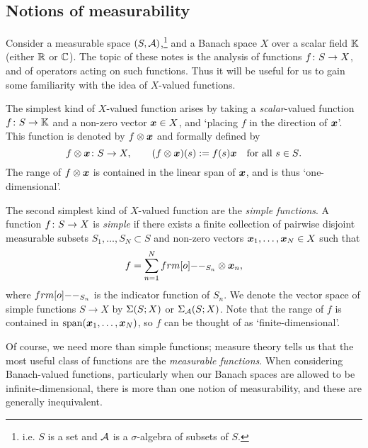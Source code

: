 
\subsection{Notions of measurability}

Consider a measurable space $(S,\mathcal{A})$,\footnote{i.e. $S$ is a set and $\mathcal{A}$ is a $\sigma$-algebra of subsets of $S$.} and a Banach space $X$ over a scalar field $\mathbb{K}$ (either $\mathbb{R}$ or $\mathbb{C}$).
The topic of these notes is the analysis of functions $f \colon S \rightarrow X$, and of operators acting on such functions.
Thus it will be useful for us to gain some familiarity with the idea of $X$-valued functions.

The simplest kind of $X$-valued function arises by taking a \emph{scalar}-valued function $f \colon S \rightarrow \mathbb{K}$ and a non-zero vector $\bm{x} \in X$, and `placing $f$ in the direction of $\bm{x}$'.
This function is denoted by $f \otimes \bm{x}$ and formally defined by
\begin{equation*}
  f \otimes \bm{x} \colon S \rightarrow X, \qquad (f \otimes \bm{x})(s) := f(s)\bm{x} \quad \text{for all $s \in S$.}
\end{equation*}
The range of $f \otimes \bm{x}$ is contained in the linear span of $\bm{x}$, and is thus `one-dimensional'.

The second simplest kind of $X$-valued function are the \emph{simple functions}.
A function $f \colon S \rightarrow X$ is \emph{simple} if there exists a finite collection of pairwise disjoint measurable subsets $S_1,\ldots,S_N \subset S$ and non-zero vectors $\bm{x}_1,\ldots,\bm{x}_N \in X$ such that
\begin{equation}\label{eqn:simple-function-standard-form}
  f = \sum_{n=1}^N \1_{S_n} \otimes \mb{x}_n ,
\end{equation}
where $\1_{S_n}$ is the indicator function of $S_n$.
We denote the vector space of simple functions $S \to X$ by $\Sigma(S;X)$ or $\Sigma_{\mathcal{A}}(S;X)$.
Note that the range of $f$ is contained in $\mathrm{span}(\bm{x}_1,\ldots,\bm{x}_N)$, so $f$ can be thought of as `finite-dimensional'.

Of course, we need more than simple functions; measure theory tells us that the most useful class of functions are the \emph{measurable functions}.
When considering Banach-valued functions, particularly when our Banach spaces are allowed to be infinite-dimensional, there is more than one notion of measurability, and these are generally inequivalent.

